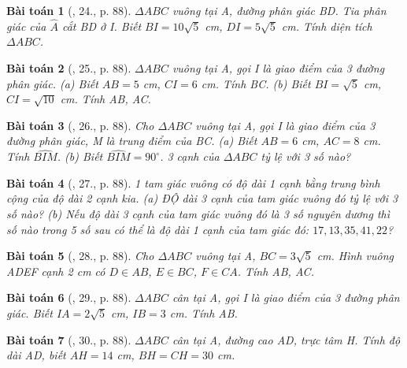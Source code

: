 \documentclass{article}
\newtheorem{baitoan}{Bài toán}
\begin{document}
\begin{baitoan}[\cite{Binh_Toan_9_tap_1}, 24., p. 88]
	$\Delta ABC$ vuông tại A, đường phân giác BD. Tia phân giác của $\widehat{A}$ cắt BD ở I. Biết $BI = 10\sqrt{5}$ {\rm cm}, $DI = 5\sqrt{5}$ {\rm cm}. Tính diện tích $\Delta ABC$.
\end{baitoan}

\begin{baitoan}[\cite{Binh_Toan_9_tap_1}, 25., p. 88]
	$\Delta ABC$ vuông tại A, gọi I là giao điểm của 3 đường phân giác. (a) Biết $AB = 5$ {\rm cm}, $CI = 6$ {\rm cm}. Tính BC. (b) Biết $BI = \sqrt{5}$ {\rm cm}, $CI = \sqrt{10}$ {\rm cm}. Tính AB, AC.
\end{baitoan}

\begin{baitoan}[\cite{Binh_Toan_9_tap_1}, 26., p. 88]
	Cho $\Delta ABC$ vuông tại A, gọi I là giao điểm của 3 đường phân giác, M là trung điểm của BC. (a) Biết $AB = 6$ {\rm cm}, $AC = 8$ {\rm cm}. Tính $\widehat{BIM}$. (b) Biết $\widehat{BIM} = 90^\circ$. 3 cạnh của $\Delta ABC$ tỷ lệ với 3 số nào?
\end{baitoan}

\begin{baitoan}[\cite{Binh_Toan_9_tap_1}, 27., p. 88]
	1 tam giác vuông có độ dài 1 cạnh bằng trung bình cộng của độ dài 2 cạnh kia. (a) ĐỘ dài 3 cạnh của tam giác vuông đó tỷ lệ với 3 số nào? (b) Nếu độ dài 3 cạnh của tam giác vuông đó là 3 số nguyên dương thì số nào trong 5 số sau có thể là độ dài 1 cạnh của tam giác đó: $17,13,35,41,22$?
\end{baitoan}

\begin{baitoan}[\cite{Binh_Toan_9_tap_1}, 28., p. 88]
	Cho $\Delta ABC$ vuông tại A, $BC = 3\sqrt{5}$ {\rm cm}. Hình vuông ADEF cạnh {\rm2 cm} có $D\in AB$, $E\in BC$, $F\in CA$. Tính AB, AC.
\end{baitoan}

\begin{baitoan}[\cite{Binh_Toan_9_tap_1}, 29., p. 88]
	$\Delta ABC$ cân tại A, gọi I là giao điểm của 3 đường phân giác. Biết $IA = 2\sqrt{5}$ {\rm cm}, $IB = 3$ {\rm cm}. Tính AB.
\end{baitoan}

\begin{baitoan}[\cite{Binh_Toan_9_tap_1}, 30., p. 88]
	$\Delta ABC$ cân tại A, đường cao AD, trực tâm H. Tính độ dài AD, biết $AH = 14$ {\rm cm}, $BH = CH = 30$ {\rm cm}.
\end{baitoan}
\end{document}
